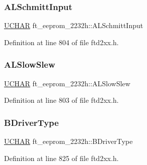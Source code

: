 \subsubsection{\texorpdfstring{A\+L\+Schmitt\+Input}{ALSchmittInput}}
{\footnotesize\ttfamily \hyperlink{CatCaloProto40MHz_2inc_2WinTypes_8h_a4f4bb67531a9bf6f0b9c6ad76aeba587}{U\+C\+H\+AR} ft\+\_\+eeprom\+\_\+2232h\+::\+A\+L\+Schmitt\+Input}



Definition at line 804 of file ftd2xx.\+h.

\mbox{\label{structft__eeprom__2232h_a202255f5052272a7807e17fd5d580438}} 
\subsubsection{\texorpdfstring{A\+L\+Slow\+Slew}{ALSlowSlew}}
{\footnotesize\ttfamily \hyperlink{CatCaloProto40MHz_2inc_2WinTypes_8h_a4f4bb67531a9bf6f0b9c6ad76aeba587}{U\+C\+H\+AR} ft\+\_\+eeprom\+\_\+2232h\+::\+A\+L\+Slow\+Slew}



Definition at line 803 of file ftd2xx.\+h.

\mbox{\label{structft__eeprom__2232h_a9a4775d141f2b01fc4d846cb3cd23368}} 
\subsubsection{\texorpdfstring{B\+Driver\+Type}{BDriverType}}
{\footnotesize\ttfamily \hyperlink{CatCaloProto40MHz_2inc_2WinTypes_8h_a4f4bb67531a9bf6f0b9c6ad76aeba587}{U\+C\+H\+AR} ft\+\_\+eeprom\+\_\+2232h\+::\+B\+Driver\+Type}



Definition at line 825 of file ftd2xx.\+h.

\mbox{\label{structft__eeprom__2232h_a3a1abb3b2944000c21b54ce123913c5f}} 
